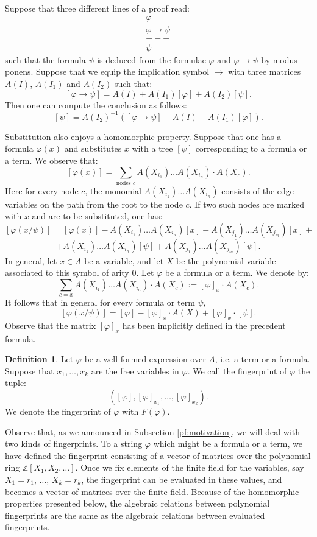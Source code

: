 \documentclass{article}
\theoremstyle{plain}
\theoremstyle{definition}
\newtheorem{definition}{Definition}[section]
\begin{document}
Suppose that three different lines of a proof read:
\begin{eqnarray*}
    \varphi \,\,\,\,\,\,\,\,\,\,\,\,\,\,\\
    \varphi \rightarrow \psi \\
    ---\\
    \psi
\end{eqnarray*}
such that the formula $\psi$ is deduced from the formulae $\varphi$ and $\varphi \rightarrow \psi$ by modus ponens. Suppose that we equip the implication symbol $\rightarrow$ with three matrices $A(I)$, $A(I_1)$ and $A(I_2)$ such that:
$$[\varphi \rightarrow \psi] = A(I) + A(I_1) [\varphi] + A(I_2)[\psi].$$
Then one can compute the conclusion as follows:
$$[\psi] = {A(I_2)}^{-1} \left ([\varphi \rightarrow \psi] - A(I) - A(I_1)[\varphi]\right ).  $$ 

Substitution also enjoys a homomorphic property. Suppose that one has a formula $\varphi(x)$ and substitutes $x$ with a tree $[\psi]$ corresponding to a formula or a term. We observe that:
$$[\varphi(x)] = \sum_{\text{nodes }c} A(X_{i_1})\dots A(X_{i_n}) \cdot A(X_c).$$
Here for every node $c$, the monomial $A(X_{i_1})\dots A(X_{i_n})$ consists of the edge-variables on the path from the root to the node $c$. If two such nodes are marked with $x$ and are to be substituted, one has:
$$[\varphi(x/\psi)] = [\varphi(x)] - A(X_{i_1})\dots A(X_{i_n})  [x] - A(X_{j_1})\dots A(X_{j_m}) [x] +$$ $$+ A(X_{i_1})\dots A(X_{i_n}) [\psi] + A(X_{j_1})\dots A(X_{j_m})[\psi].$$
In general, let $x \in A$ be a variable, and let $X$ be the polynomial variable associated to this symbol of arity $0$. Let $\varphi$ be a formula or a term. We denote by:
$$\sum _{c = x} A(X_{i_1})\dots A(X_{i_n}) \cdot A(X_c) := [\varphi]_x \cdot A(X_c).$$
It follows that in general for every formula or term $\psi$,
$$[\varphi(x/\psi)] = [\varphi] - [\varphi]_x \cdot A(X) + [\varphi]_x \cdot [\psi]. $$ 
Observe that the matrix $[\varphi]_x$ has been implicitly defined in the precedent formula. 

\begin{definition}\label{deffingerprint}
Let $\varphi$ be a well-formed expression over $A$, i.e. a term or a formula. Suppose that $x_1, \dots, x_k$ are the free variables in $\varphi$. We call the fingerprint of $\varphi$ the tuple:
$$([\varphi], [\varphi]_{x_1}, \dots, [\varphi]_{x_k}).$$
We denote the fingerprint of $\varphi$ with $F(\varphi)$.
\end{definition} 

Observe that, as we announced in Subsection \ref{pf:motivation}, we will deal with two kinds of fingerprints. To a string $\varphi$ which might be a formula or a term, we have defined the fingerprint consisting of a vector of matrices over the polynomial ring $\mathbb Z [X_1, X_2, \dots]$. Once we fix elements of the finite field for the variables, say $X_1 = r_1$, $\dots$, $X_k = r_k$, the fingerprint can be evaluated in these values, and becomes a vector of matrices over the finite field. Because of the homomorphic properties presented below, the algebraic relations between polynomial fingerprints are the same as the algebraic relations between evaluated fingerprints.  
\end{document}
